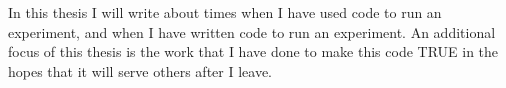 
In this thesis I will write about times when I have used code to run an experiment, and when I have written code to run an experiment.
An additional focus of this thesis is the work that I have done to make this code TRUE in the hopes that it will serve others after I leave.

